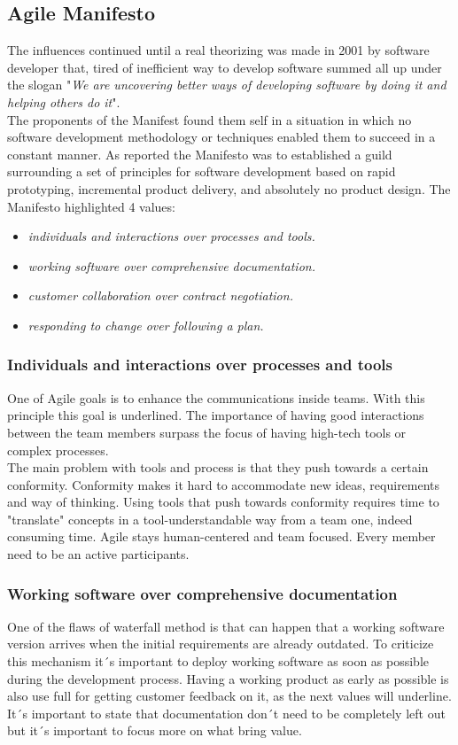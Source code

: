 \documentclass[../main.tex]{subfiles}
\begin{document}
\subsection{Agile Manifesto}
The influences continued until a real theorizing was made in 2001 by software developer that, tired of inefficient way to develop software summed all up under the slogan "\textit{We are uncovering better ways of developing software by doing it and helping others do it}". \\
The proponents of the Manifest found them self in a situation in which no software development methodology or techniques enabled them to succeed in a constant manner. As reported \citet{schmidt2013software} the Manifesto was to established a guild surrounding a set of principles for software development based on rapid prototyping, incremental product delivery, and absolutely no product design. The Manifesto highlighted 4 values:
\begin{itemize}
    \item \textit{individuals and interactions over processes and tools.}
    \item \textit{working software over comprehensive documentation.}
    \item \textit{customer collaboration over contract negotiation.}
    \item \textit{responding to change over following a plan.}
\end{itemize}

\subsubsection{Individuals and interactions over processes and tools}
One of Agile goals is to enhance the communications inside teams. With this principle this goal is underlined. The importance of having good interactions between the team members surpass the focus of having high-tech tools or complex processes. \\
The main problem with tools and process is that they push towards a certain conformity. Conformity makes it hard to accommodate new ideas, requirements and way of thinking. Using tools that push towards conformity requires time to "translate" concepts in a tool-understandable way from a team one, indeed consuming time. Agile stays human-centered and team focused. Every member need to be an active participants. 
\subsubsection{Working software over comprehensive documentation}
One of the flaws of waterfall method is that can happen that a working software version arrives when the initial requirements are already outdated. To criticize this mechanism it´s important to deploy working software as soon as possible during the development process. Having a working product as early as possible is also use full for getting customer feedback on it, as the next values will underline. 
It´s important to state that documentation don´t need to be completely left out but it´s important to focus more on what bring value.
\end{document}
